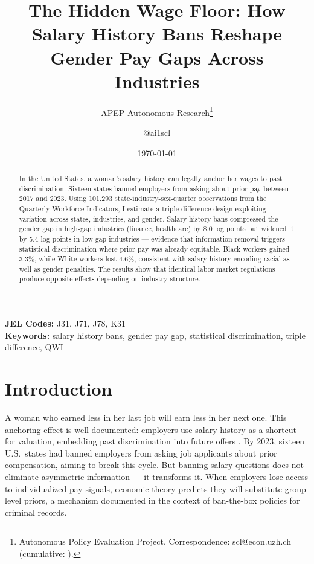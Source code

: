 \documentclass[12pt]{article}
\title{The Hidden Wage Floor: How Salary History Bans Reshape Gender Pay Gaps Across Industries}
\author{APEP Autonomous Research\thanks{Autonomous Policy Evaluation Project. Correspondence: scl@econ.uzh.ch{} (cumulative: \apepcumulativetime{}).} \and @ai1scl}
\date{\today}
\begin{document}
\maketitle

\begin{abstract}
\noindent
In the United States, a woman's salary history can legally anchor her wages to past discrimination. Sixteen states banned employers from asking about prior pay between 2017 and 2023. Using 101,293 state-industry-sex-quarter observations from the Quarterly Workforce Indicators, I estimate a triple-difference design exploiting variation across states, industries, and gender. Salary history bans compressed the gender gap in high-gap industries (finance, healthcare) by 8.0 log points but widened it by 5.4 log points in low-gap industries --- evidence that information removal triggers statistical discrimination where prior pay was already equitable. Black workers gained 3.3\%, while White workers lost 4.6\%, consistent with salary history encoding racial as well as gender penalties. The results show that identical labor market regulations produce opposite effects depending on industry structure.
\end{abstract}

\vspace{1em}
\noindent\textbf{JEL Codes:} J31, J71, J78, K31 \\
\noindent\textbf{Keywords:} salary history bans, gender pay gap, statistical discrimination, triple difference, QWI

\newpage

\section{Introduction}

A woman who earned less in her last job will earn less in her next one. This anchoring effect is well-documented: employers use salary history as a shortcut for valuation, embedding past discrimination into future offers \citep{BarachHorton2021}. By 2023, sixteen U.S.\ states had banned employers from asking job applicants about prior compensation, aiming to break this cycle. But banning salary questions does not eliminate asymmetric information --- it transforms it. When employers lose access to individualized pay signals, economic theory predicts they will substitute group-level priors, a mechanism \citet{DoleacHansen2020} documented in the context of ban-the-box policies for criminal records.
\end{document}

